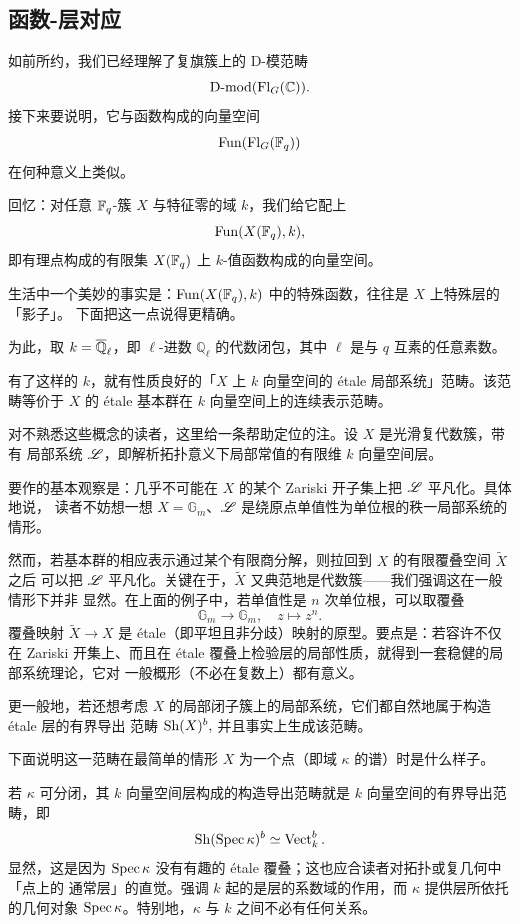 \subsection{函数-层对应}

\ssszh 如前所约，我们已经理解了复旗簇上的 D-模范畴
\[
\operatorname{D-mod}(\operatorname{Fl}_G(\mathbb{C})).
\]
接下来要说明，它与函数构成的向量空间
$$\operatorname{Fun}(\operatorname{Fl}_G(\mathbb{F}_q))$$
在何种意义上类似。

\ssszh 回忆：对任意 $\mathbb{F}_q$-簇 $X$ 与特征零的域 $k$，我们给它配上
\[
\operatorname{Fun}(X(\mathbb{F}_q),k),
\]
即有理点构成的有限集 $X(\mathbb{F}_q)$ 上 $k$-值函数构成的向量空间。

生活中一个美妙的事实是：$\operatorname{Fun}(X(\mathbb{F}_q),k)$ 中的特殊函数，往往是 $X$ 上特殊层的「影子」。
下面把这一点说得更精确。

\ssszh\label{s:ladic} 为此，取 $k=\overline{\mathbb{Q}}_\ell$，即 $\ell$-进数 $\mathbb{Q}_\ell$ 的代数闭包，其中
$\ell$ 是与 $q$ 互素的任意素数。

有了这样的 $k$，就有性质良好的「$X$ 上 $k$ 向量空间的 étale 局部系统」范畴。该范畴等价于
$X$ 的 étale 基本群在 $k$ 向量空间上的连续表示范畴。

\begin{re} 对不熟悉这些概念的读者，这里给一条帮助定位的注。设 $X$ 是光滑复代数簇，带有
局部系统 $\mathscr{L}$，即解析拓扑意义下局部常值的有限维 $k$ 向量空间层。

要作的基本观察是：几乎不可能在 $X$ 的某个 Zariski 开子集上把 $\mathscr{L}$ 平凡化。具体地说，
读者不妨想一想 $X=\mathbb{G}_m$、$\mathscr{L}$ 是绕原点单值性为单位根的秩一局部系统的情形。

然而，若基本群的相应表示通过某个有限商分解，则拉回到 $X$ 的有限覆叠空间 $\tilde{X}$ 之后
可以把 $\mathscr{L}$ 平凡化。关键在于，$\tilde{X}$ 又典范地是代数簇——我们强调这在一般情形下并非
显然。在上面的例子中，若单值性是 $n$ 次单位根，可以取覆叠
\[
\mathbb{G}_m\to\mathbb{G}_m,\quad z\mapsto z^n.
\]
覆叠映射 $\tilde{X}\to X$ 是 étale（即平坦且非分歧）映射的原型。要点是：若容许不仅在
Zariski 开集上、而且在 étale 覆叠上检验层的局部性质，就得到一套稳健的局部系统理论，它对
一般概形（不必在复数上）都有意义。
\end{re}

更一般地，若还想考虑 $X$ 的局部闭子簇上的局部系统，它们都自然地属于构造 étale 层的有界导出
范畴
$
\operatorname{Sh}(X)^b,
$
并且事实上生成该范畴。

\ssszh 下面说明这一范畴在最简单的情形 $X$ 为一个点（即域 $\kappa$ 的谱）时是什么样子。

若 $\kappa$ 可分闭，其 $k$ 向量空间层构成的构造导出范畴就是 $k$ 向量空间的有界导出范畴，即
\[
\operatorname{Sh}(\operatorname{Spec }\kappa)^b\simeq\operatorname{Vect}_k^b.
\]
显然，这是因为 $\operatorname{Spec }\kappa$ 没有有趣的 étale 覆叠；这也应合读者对拓扑或复几何中「点上的
通常层」的直觉。强调 $k$ 起的是层的系数域的作用，而 $\kappa$ 提供层所依托的几何对象
$\operatorname{Spec }\kappa$。特别地，$\kappa$ 与 $k$ 之间不必有任何关系。

